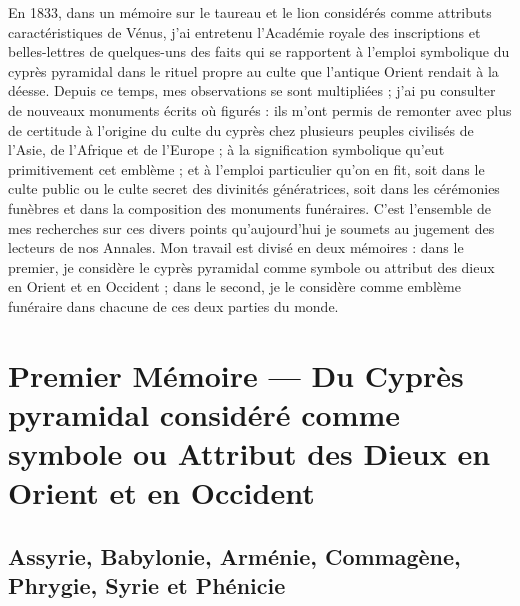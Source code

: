 \documentclass[a4paper, 11pt, oneside, polutonikogreek, french]{article}
\begin{document}
En 1833, dans un mémoire sur le taureau et le lion considérés comme attributs caractéristiques de Vénus, j'ai entretenu l'Académie royale des inscriptions et belles-lettres de quelques-uns des faits qui se rapportent à l'emploi symbolique du cyprès pyramidal dans le rituel propre au culte que l'antique Orient rendait à la déesse. Depuis ce temps, mes observations se sont multipliées ; j'ai pu consulter de nouveaux monuments écrits où figurés : ils m'ont permis de remonter avec plus de certitude à l'origine du culte du cyprès chez plusieurs peuples civilisés de l'Asie, de l'Afrique et de l'Europe ; à la signification symbolique qu'eut primitivement cet emblème ; et à l'emploi particulier qu'on en fit, soit dans le culte public ou le culte secret des divinités génératrices, soit dans les cérémonies funèbres et dans la composition des monuments funéraires. C'est l'ensemble de mes recherches sur ces divers points qu'aujourd'hui je soumets au jugement des lecteurs de nos Annales. Mon travail est divisé en deux mémoires : dans le premier, je considère le cyprès pyramidal comme symbole ou attribut des dieux en Orient et en Occident ; dans le second, je le considère comme emblème funéraire dans chacune de ces deux parties du monde.

\clearpage
\section{Premier Mémoire --- Du Cyprès pyramidal considéré comme symbole ou Attribut des Dieux en Orient et en Occident}
\subsection{Assyrie, Babylonie, Arménie, Commagène, Phrygie, Syrie et Phénicie}
\end{document}

